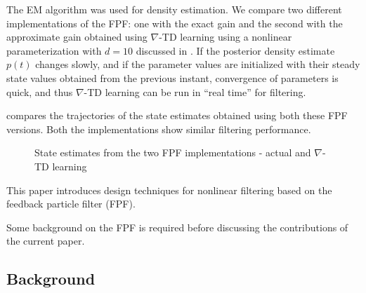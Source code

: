 The EM algorithm was used for density estimation. We compare two different implementations of the FPF: one with the exact gain and the second with the approximate gain obtained using $\nabla$-TD learning using a nonlinear parameterization with $d=10$ discussed in . If the posterior density estimate $p(t)$ changes slowly, and if the parameter values are initialized with their steady state values obtained from the previous instant, convergence of parameters is quick, and thus $\nabla$-TD learning can be run in ``real time'' for filtering.

 compares the trajectories of the state estimates obtained using both these FPF versions. Both the implementations show similar filtering performance.

\begin{figure}
	\begin{center}
		\caption{ State estimates from the two FPF implementations - actual and $\nabla$-TD learning }
		\label{Chap4_Fig_FPF_EM_TD}
	\end{center}
\end{figure}

%

\label{s:intro}
This paper introduces design techniques for nonlinear filtering based on the  feedback particle filter (FPF).   

Some background on the FPF is required before discussing the contributions of the current paper.

\subsection{Background}

